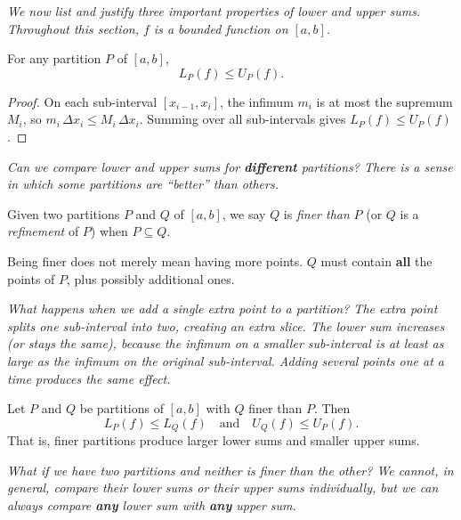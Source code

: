 \textit{We now list and justify three important properties of lower and upper sums.  Throughout this section, $f$ is a bounded function on $[a,b]$.}

\begin{proposition}
\label{thm:7-6}
For any partition $P$ of $[a,b]$,
\[
  L_P(f) \le U_P(f).
\]
\end{proposition}

\begin{proof}
On each sub-interval $[x_{i-1}, x_i]$, the infimum $m_i$ is at most the supremum $M_i$, so $m_i\,\Delta x_i \le M_i\,\Delta x_i$.  Summing over all sub-intervals gives $L_P(f) \le U_P(f)$.
\end{proof}

\textit{Can we compare lower and upper sums for \textbf{different} partitions?  There is a sense in which some partitions are ``better'' than others.}

\begin{definition}[Refinement]
\label{def:7-12}
Given two partitions $P$ and $Q$ of $[a,b]$, we say $Q$ is \emph{finer than} $P$ (or $Q$ is a \emph{refinement} of $P$) when $P \subseteq Q$.
\end{definition}

\begin{remark}
Being finer does not merely mean having more points.  $Q$ must contain \textbf{all} the points of $P$, plus possibly additional ones.
\end{remark}

\textit{What happens when we add a single extra point to a partition?  The extra point splits one sub-interval into two, creating an extra slice.  The lower sum increases (or stays the same), because the infimum on a smaller sub-interval is at least as large as the infimum on the original sub-interval.  Adding several points one at a time produces the same effect.}

\begin{proposition}
\label{thm:7-7}
Let $P$ and $Q$ be partitions of $[a,b]$ with $Q$ finer than $P$.  Then
\[
  L_P(f) \le L_Q(f) \quad\text{and}\quad U_Q(f) \le U_P(f).
\]
That is, finer partitions produce larger lower sums and smaller upper sums.
\end{proposition}

\textit{What if we have two partitions and neither is finer than the other?  We cannot, in general, compare their lower sums or their upper sums individually, but we can always compare \textbf{any} lower sum with \textbf{any} upper sum.}

